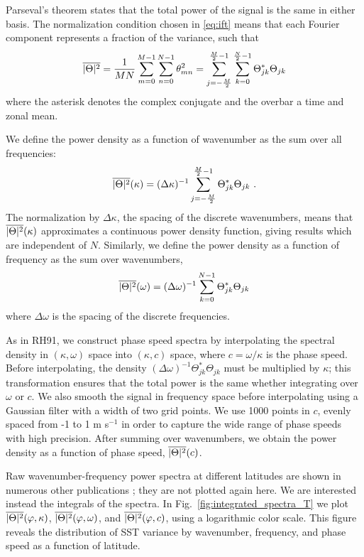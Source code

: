 \documentclass[10pt]{article}
\newcommand{\ol}{\ensuremath{\overline}}
\begin{document}
Parseval's theorem states that the total power of the signal is the same in either basis. The normalization condition chosen in \eqref{eq:ift} means that each Fourier component represents a fraction of the variance, such that 
\begin{equation}
\ol{|\Theta|^2} = \frac{1}{MN} \sum_{m=0}^{M-1} \sum_{n=0}^{N-1} \theta_{mn}^2 = \sum_{j=-\frac{M}{2}}^{\frac{M}{2}-1} \sum_{k=0}^{\frac{N}{2}-1} \Theta_{jk}^\ast  \Theta_{jk} 
\end{equation}
where the asterisk denotes the complex conjugate and the overbar a time and zonal mean.

We define the power density as a function of wavenumber as the sum over all frequencies:
\begin{equation}
\ol{|\Theta|^2}(\kappa) = (\Delta \kappa)^{-1} \sum_{j=-\frac{M}{2}}^{\frac{M}{2}-1} \Theta_{jk}^\ast  \Theta_{jk} \ .
\label{eq:Theta_kappa}
\end{equation}
The normalization by $\Delta \kappa$, the spacing of the discrete wavenumbers, means that $\ol{|\Theta|^2}(\kappa)$ approximates a continuous power density function, giving results which are independent of $N$.  
Similarly, we define the power density as a function of frequency as the sum over wavenumbers,
\begin{equation}
\ol{|\Theta|^2}(\omega) = (\Delta \omega)^{-1} \sum_{k=0}^{N-1} \Theta_{jk}^\ast   \Theta_{jk} 
\end{equation}
where $\Delta \omega$ is the spacing of the discrete frequencies.

As in RH91, we construct phase speed spectra by interpolating the spectral density in $(\kappa, \omega)$ space into $(\kappa, c)$ space, where $c = \omega / \kappa$ is the phase speed. Before interpolating, the density $(\Delta \omega)^{-1}\Theta_{jk}^\ast   \Theta_{jk}$ must be multiplied by $\kappa$; this transformation ensures that the total power is the same whether integrating over $\omega$ or $c$. We also smooth the signal in frequency space before interpolating using a Gaussian filter with a width of two grid points. We use 1000 points in $c$, evenly spaced from -1 to 1 m s$^{-1}$ in order to capture the wide range of phase speeds with high precision. After summing over wavenumbers, we obtain the power density as a function of phase speed, $\ol{|\Theta|^2}(c)$.

Raw wavenumber-frequency power spectra at different latitudes are shown in numerous other publications \citep[e.g.][]{KillworthEtAl1997,Wunsch2010,WorthamWunsch2014}; they are not plotted again here. We are interested instead the integrals of the spectra.
In Fig.~\ref{fig:integrated_spectra_T} we plot $\ol{|\Theta|^2}(\varphi, \kappa)$, $\ol{|\Theta|^2}(\varphi, \omega)$, and $\ol{|\Theta|^2}(\varphi, c)$, using a logarithmic color scale. This figure reveals the distribution of SST variance by wavenumber, frequency, and phase speed as a function of latitude.
\end{document}
